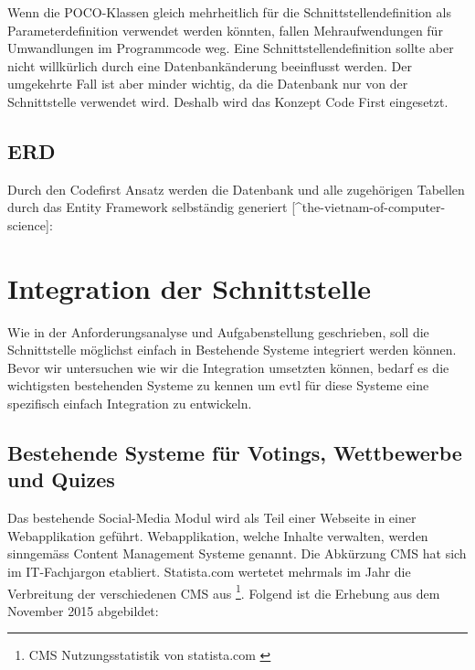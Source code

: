 Wenn die POCO-Klassen gleich mehrheitlich für die
Schnittstellendefinition als Parameterdefinition verwendet werden
könnten, fallen Mehraufwendungen für Umwandlungen im Programmcode weg.
Eine Schnittstellendefinition sollte aber nicht willkürlich durch eine
Datenbankänderung beeinflusst werden. Der umgekehrte Fall ist aber
minder wichtig, da die Datenbank nur von der Schnittstelle verwendet
wird. Deshalb wird das Konzept Code First eingesetzt.

\subsection{ERD}\label{erd}

Durch den Codefirst Ansatz werden die Datenbank und alle zugehörigen
Tabellen durch das Entity Framework selbständig generiert
{[}\^{}the-vietnam-of-computer-science{]}:
\autocite{the-vietnam-of-computer-science}

\hypertarget{integration-der-schnittstelle}{\section{Integration der
Schnittstelle}\label{integration-der-schnittstelle}}

Wie in der Anforderungsanalyse und Aufgabenstellung geschrieben, soll
die Schnittstelle möglichst einfach in Bestehende Systeme integriert
werden können. Bevor wir untersuchen wie wir die Integration umsetzten
können, bedarf es die wichtigsten bestehenden Systeme zu kennen um evtl
für diese Systeme eine spezifisch einfach Integration zu entwickeln.

\subsection{Bestehende Systeme für Votings, Wettbewerbe und
Quizes}\label{bestehende-systeme-fuxfcr-votings-wettbewerbe-und-quizes}

Das bestehende Social-Media Modul wird als Teil einer Webseite in einer
Webapplikation geführt. Webapplikation, welche Inhalte verwalten, werden
sinngemäss Content Management Systeme genannt. Die Abkürzung CMS hat
sich im IT-Fachjargon etabliert. Statista.com wertetet mehrmals im Jahr
die Verbreitung der verschiedenen CMS aus \footnote{CMS
  Nutzungsstatistik von statista.com \autocite{statisticinfostatista}}.
Folgend ist die Erhebung aus dem November 2015 abgebildet:

